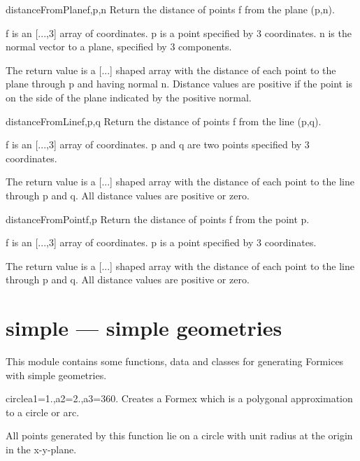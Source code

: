 {{\begin{funcdesc}{distanceFromPlane}{f,p,n}
    Return the distance of points f from the plane (p,n).

    f is an [...,3] array of coordinates.
    p is a point specified by 3 coordinates.
    n is the normal vector to a plane, specified by 3 components.

    The return value is a [...] shaped array with the distance of
    each point to the plane through p and having normal n.
    Distance values are positive if the point is on the side of the
    plane indicated by the positive normal.
\end{funcdesc}
    


\begin{funcdesc}{distanceFromLine}{f,p,q}
    Return the distance of points f from the line (p,q).

    f is an [...,3] array of coordinates.
    p and q are two points specified by 3 coordinates.

    The return value is a [...] shaped array with the distance of
    each point to the line through p and q.
    All distance values are positive or zero.
\end{funcdesc}
    


\begin{funcdesc}{distanceFromPoint}{f,p}
    Return the distance of points f from the point p.

    f is an [...,3] array of coordinates.
    p is a point specified by 3 coordinates.

    The return value is a [...] shaped array with the distance of
    each point to the line through p and q.
    All distance values are positive or zero.
\end{funcdesc}
    


\section{simple --- simple geometries}
{\label{sec:simple}
This module contains some functions, data and classes for generating Formices with simple geometries. 


\begin{funcdesc}{circle}{a1=1.,a2=2.,a3=360.}
Creates a Formex which is a polygonal approximation to a circle or arc.

All points generated by this function lie on a circle with unit radius at the origin in the x-y-plane.


\end{funcdesc}}}}
